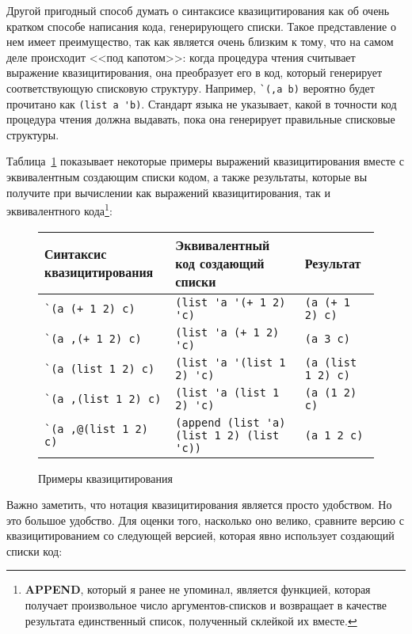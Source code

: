 Другой пригодный способ думать о синтаксисе квазицитирования как об очень кратком способе
написания кода, генерирующего списки. Такое представление о нем имеет преимущество, так
как является очень близким к тому, что на самом деле происходит <<под капотом>>: когда
процедура чтения считывает выражение квазицитирования, она преобразует его в код, который
генерирует соответствующую списковую структуру. Например, \lstinline!`(,a b)! вероятно
будет прочитано как \lstinline!(list a 'b)!. Стандарт языка не указывает, какой в точности
код процедура чтения должна выдавать, пока она генерирует правильные списковые структуры.

Таблица~\ref{table:08-1} показывает некоторые примеры выражений квазицитирования вместе с
эквивалентным создающим списки кодом, а также результаты, которые вы получите при
вычислении как выражений квазицитирования, так и эквивалентного
кода\footnote{\textbf{APPEND}, который я ранее не упоминал, является функцией, которая
  получает произвольное число аргументов-списков и возвращает в качестве результата
  единственный список, полученный склейкой их вместе.}:

\begin{figure}[tb]
\begin{tabular}{|>{\centering}m{32mm}|>{\centering}m{60mm}|>{\centering}m{30mm}|}
\hline{}
Синтаксис квазицитирования & Эквивалентный код создающий списки & Результат \\
\hline{}
\lstinline!`(a (+ 1 2) c)! & \lstinline!(list 'a '(+ 1 2) 'c)! & \lstinline!(a (+ 1 2) c)! \\
\lstinline!`(a ,(+ 1 2) c)! & \lstinline!(list 'a (+ 1 2) 'c)! & \lstinline!(a 3 c)! \\
\lstinline!`(a (list 1 2) c)! & \lstinline!(list 'a '(list 1 2) 'c)! & \lstinline!(a (list 1 2) c)! \\
\lstinline!`(a ,(list 1 2) c)! & \lstinline!(list 'a (list 1 2) 'c)! & \lstinline!(a (1 2) c)! \\
\lstinline!`(a ,@(list 1 2) c)! & \lstinline!(append (list 'a) (list 1 2) (list 'c))! & \lstinline!(a 1 2 c)! \\
\hline
\end{tabular}
  \caption{Примеры квазицитирования} 
  \label{table:08-1}
\end{figure}

Важно заметить, что нотация квазицитирования является просто удобством. Но это большое
удобство. Для оценки того, насколько оно велико, сравните версию  с
квазицитированием со следующей версией, которая явно использует создающий списки код:

